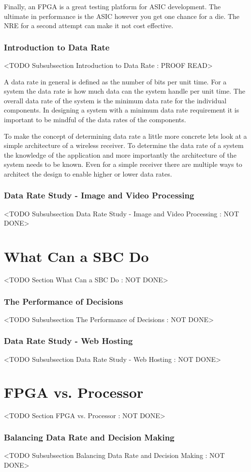 Finally, an FPGA is a great testing platform for ASIC development. The ultimate in performance is the ASIC however you get one chance for a die. The NRE for a second attempt can make it not cost effective.

\subsubsection{Introduction to Data Rate}
	<TODO Subsubsection  Introduction to Data Rate : PROOF READ>

A data rate in general is defined as the number of bits per unit time. For a system the data rate is how much data can the system handle per unit time. The overall data rate of the system is the minimum data rate for the individual components. In designing a system with a minimum data rate requirement it is important to be mindful of the data rates of the components.

To make the concept of determining data rate a little more concrete lets look at a simple architecture of a wireless receiver. To determine the data rate of a system the knowledge of the application and more importantly the architecture of the system needs to be known. Even for a simple receiver there are multiple ways to architect the design to enable higher or lower data rates. 

\subsubsection{Data Rate Study - Image and Video Processing}
	<TODO Subsubsection  Data Rate Study - Image and Video Processing : NOT DONE>

\section{What Can a SBC Do}
	<TODO Section What Can a SBC Do : NOT DONE>

\subsubsection{The Performance of Decisions}
	<TODO Subsubsection  The Performance of Decisions : NOT DONE>

\subsubsection{Data Rate Study - Web Hosting}
	<TODO Subsubsection  Data Rate Study - Web Hosting : NOT DONE>

\section{FPGA vs. Processor}
	<TODO Section FPGA vs. Processor : NOT DONE>

\subsubsection{Balancing Data Rate and Decision Making}
	<TODO Subsubsection  Balancing Data Rate and Decision Making : NOT DONE>
